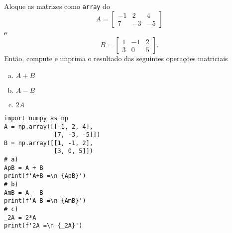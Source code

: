 \begin{exer}
  Aloque as matrizes como \lstinline+array+ do {\numpy}
  \begin{equation}
    A =
    \begin{bmatrix}
        -1 & 2 & 4\\
        7 & -3 & -5
      \end{bmatrix}      
  \end{equation}
  e
  \begin{equation}
    B =
    \begin{bmatrix}
        1 & -1 & 2\\
        3 & 0 & 5
      \end{bmatrix}.      
  \end{equation}
  Então, compute e imprima o resultado das seguintes operações matriciais
  \begin{enumerate}[a)]
  \item $A + B$
  \item $A - B$
  \item $2A$
  \end{enumerate}
\end{exer}
\begin{resp}

\begin{lstlisting}
import numpy as np
A = np.array([[-1, 2, 4],
              [7, -3, -5]])
B = np.array([[1, -1, 2],
              [3, 0, 5]])
# a)
ApB = A + B
print(f'A+B =\n {ApB}')
# b)
AmB = A - B
print(f'A-B =\n {AmB}')
# c)
_2A = 2*A
print(f'2A =\n {_2A}')
\end{lstlisting}

\end{resp}


